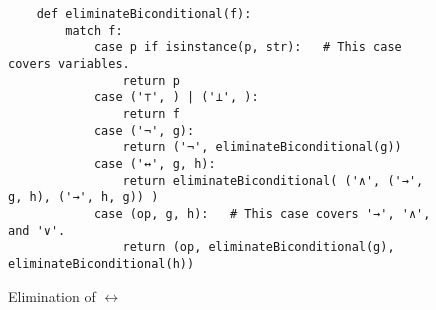 \begin{figure}[!ht]
  \centering
\begin{verbatim}
    def eliminateBiconditional(f):
        match f:
            case p if isinstance(p, str):   # This case covers variables.
                return p
            case ('⊤', ) | ('⊥', ):
                return f
            case ('¬', g):
                return ('¬', eliminateBiconditional(g))
            case ('↔', g, h):
                return eliminateBiconditional( ('∧', ('→', g, h), ('→', h, g)) )
            case (op, g, h):   # This case covers '→', '∧', and '∨'.
                return (op, eliminateBiconditional(g), eliminateBiconditional(h))
\end{verbatim}
\vspace*{-0.3cm}
  \caption{Elimination of $\leftrightarrow$}
  \label{fig:elimBiconditional}
\end{figure} 

